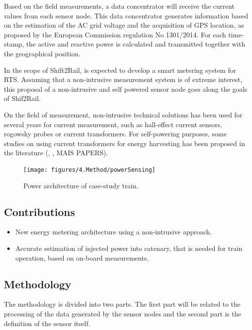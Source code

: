Based on the field measurements, a data concentrator will receive the current values from each sensor node. This data concentrator generates information based on the estimation of the AC grid voltage and the acquisition of GPS location, as proposed by the European Commission regulation No 1301/2014. For each time-stamp, the active and reactive power is calculated and transmitted together with the geographical position.

In the scope of Shift2Rail, is expected to develop a smart metering system for RTS. Assuming that a non-intrusive measurement system is of extreme interest, this proposal of a non-intrusive and self powered sensor node goes along the goals of Shif2Rail.

On the field of measurement, non-intrusive technical solutions has been used for several years for current measurement, such as hall-effect current sensors, rogowsky probes or current transformers.
For self-powering purposes, some studies on using current transformers for energy harvesting has been proposed in the literature (\cite{ahola2008}, \cite{brunelli2016}, MAIS PAPERS).


\begin{figure}[h!]
	\centering
	\vspace{-1em}
	\texttt{[image: figures/4.Method/powerSensing]}
	\caption{Power architecture of case-study train.}
	\label{fig:4.powerSensing}
\end{figure}



\subsection{Contributions}

\begin{itemize}
	\setlength\itemsep{0em}
	\item New energy metering architecture using a non-intrusive approach.
	
	\item Accurate estimation of injected power into catenary, that is needed for train operation, based on on-board measurements.

\end{itemize}


\subsection{Methodology}

The methodology is divided into two parts. The first part will be related to the processing of the data generated by the sensor nodes and the second part is the definition of the sensor itself.

